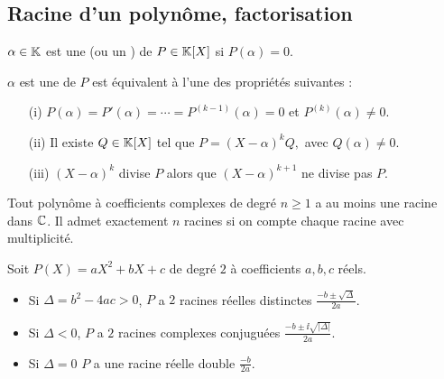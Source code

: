 \documentclass[10pt,class=article,crop=false]{standalone}
\begin{document}
\begin{multicols}{2}

\subsection{Racine d'un polynôme, factorisation}

$\alpha\in\mathbb{K}$ est une  (ou un ) de $P\in\mathbb{K}[X]$ si $P(\alpha)=0$.


$\alpha$ est une  de $P$ est équivalent à l'une des propriétés suivantes :
\begin{itemize}
	\item[(i)]  $P(\alpha)= P'(\alpha)=\cdots=P^{(k-1)}(\alpha)=0$ et $P^{(k)}(\alpha) \neq 0$.
	
	\item[(ii)] Il existe  $Q \in\mathbb{K}[X]$ tel que $P=(X-\alpha)^kQ,$ avec $Q(\alpha) \neq 0$.
	
	\item[(iii)]$(X-\alpha )^k$ divise $P$ alors que $(X- \alpha )^{k+1}$ ne divise pas $P$.
\end{itemize}


\begin{theoreme}
	Tout polynôme à coefficients complexes de degré $n \ge 1$
	a au moins une racine dans $\mathbb{C}$.
	Il admet exactement $n$ racines si on compte chaque racine
	avec multiplicité.
\end{theoreme}


\begin{exemple}
	Soit $P(X)=aX^2+bX+c$ de degré $2$ à coefficients $a,b,c$ réels.
	\begin{itemize}
		\item Si $\Delta = b^2-4ac > 0$, $P$ a $2$ racines réelles distinctes $\frac{-b\pm\sqrt{\Delta}}{2a}$.
		\item Si $\Delta < 0$, $P$ a $2$ racines complexes conjuguées $\frac{-b \pm \ii\sqrt{|\Delta|}}{2a}$.
		\item Si $\Delta = 0$ $P$ a une racine réelle double $\frac{-b}{2a}$.
	\end{itemize}
\end{exemple}



\end{multicols}
\end{document}
